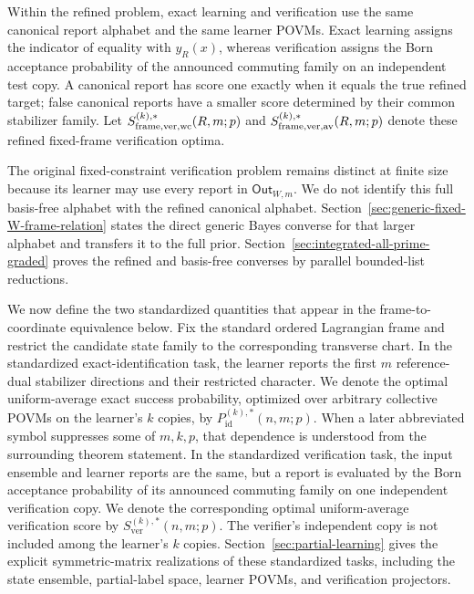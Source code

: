 \documentclass[11pt]{article}
\newcommand{\1}{\mathbf 1}
\theoremstyle{plain}
\theoremstyle{definition}
\theoremstyle{remark}
\begin{document}
Within the refined problem, exact learning and verification use the same
canonical report alphabet and the same learner POVMs.  Exact learning assigns
the indicator of equality with $y_R(x)$, whereas verification assigns the Born
acceptance probability of the announced commuting family on an independent
test copy.  A canonical report has score one exactly when it equals the true
refined target; false canonical reports have a smaller score determined by
their common stabilizer family.  Let
$S_{\rm frame,ver,wc}^{(k),*}(R,m;p)$ and
$S_{\rm frame,ver,av}^{(k),*}(R,m;p)$ denote these refined fixed-frame
verification optima.

The original fixed-constraint verification problem remains distinct at finite
size because its learner may use every report in $\mathsf{Out}_{W,m}$.  We do
not identify this full basis-free alphabet with the refined canonical
alphabet.  Section~\ref{sec:generic-fixed-W-frame-relation} states the direct
generic Bayes converse for that larger alphabet and transfers it to the full
prior.  Section~\ref{sec:integrated-all-prime-graded} proves the refined and
basis-free converses by parallel bounded-list reductions.

We now define the two standardized quantities that appear in the
frame-to-coordinate equivalence below.  Fix the standard ordered Lagrangian
frame and restrict the candidate state family to the corresponding transverse
chart.  In the standardized exact-identification task, the learner reports the
first $m$ reference-dual stabilizer directions and their restricted character.
We denote the optimal uniform-average exact success probability, optimized
over arbitrary collective POVMs on the learner's $k$ copies, by
$P_{\mathrm{id}}^{(k),*}(n,m;p)$.  When a later abbreviated symbol suppresses some
of $m,k,p$, that dependence is understood from the surrounding theorem
statement.  In the standardized verification task, the input
ensemble and learner reports are the same, but a report is evaluated by the
Born acceptance probability of its announced commuting family on one
independent verification copy.  We denote the corresponding optimal
uniform-average verification score by $S_{\mathrm{ver}}^{(k),*}(n,m;p)$.  The
verifier's independent copy is not included among the learner's $k$ copies.
Section~\ref{sec:partial-learning} gives the explicit symmetric-matrix
realizations of these standardized tasks, including the state ensemble,
partial-label space, learner POVMs, and verification projectors.
\end{document}
